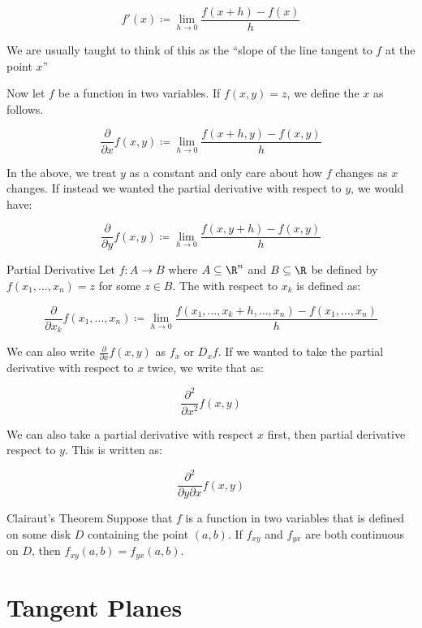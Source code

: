 \[ f\prime(x) \coloneq \lim_{h \to 0} \frac{f(x+h) - f(x)}{h} \]

We are usually taught to think of this as the ``slope of the line tangent to $f$ at the point $x$''

Now let $f$ be a function in two variables. If $f(x,y) = z$, we define the  $x$ as follows.

\[ \frac{\partial}{\partial x} f(x,y) \coloneq \lim_{h \to 0} \frac{f(x+h, y) - f(x,y)}{h} \]

In the above, we treat $y$ as a constant and only care about how $f$ changes as $x$ changes. If instead we wanted the partial derivative with respect to $y$, we would have:

\[ \frac{\partial}{\partial y} f(x,y) \coloneq \lim_{h \to 0} \frac{f(x, y+h) - f(x,y)}{h} \]

\begin{dfnbox}{Partial Derivative}{}
    Let $f : A \to B$ where $A \subseteq \R^n$ and $B \subseteq \R$ be defined by $f(x_1, \ldots, x_n) = z$ for some $z \in B$. The  with respect to $x_k$ is defined as:

    \[ \frac{\partial}{\partial x_k} f(x_1, \ldots, x_n) \coloneq \lim_{h \to 0} \frac{f(x_1, \ldots, x_k + h, \ldots, x_n) - f(x_1, \ldots, x_n)}{h} \]
\end{dfnbox}



We can also write $\frac{\partial}{\partial x} f(x,y)$ as $f_x$ or $D_x f$. If we wanted to take the partial derivative with respect to $x$ twice, we write that as:

\[ \frac{\partial^2}{\partial x^2} f(x,y) \]

We can also take a partial derivative with respect $x$ first, then partial derivative respect to $y$. This is written as:

\[ \frac{\partial^2}{\partial y \partial x} f(x,y) \]

\begin{thmbox}{Clairaut's Theorem}{}
    Suppose that $f$ is a function in two variables that is defined on some disk $D$ containing the point $(a,b)$. If $f_{xy}$ and $f_{yx}$ are both continuous on $D$, then $f_{xy}(a,b) = f_{yx}(a,b)$.
\end{thmbox}

\section{Tangent Planes}

